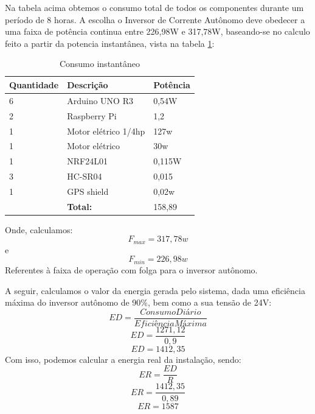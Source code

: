 Na tabela acima obtemos o consumo total de todos os componentes durante um período de 8 horas. A escolha o Inversor de Corrente Autônomo deve obedecer a uma faixa de potência continua entre 226,98W e 317,78W, baseando-se no calculo feito a partir da potencia instantânea, vista na tabela \ref{cap:proposta:tab:instantaneo}: 

\begin{table}[]
\centering
\caption{Consumo instantâneo}
\label{cap:proposta:tab:instantaneo}
\begin{tabular}{l|l|l|}
\hline
\multicolumn{1}{|l|}{\textbf{Quantidade}} & \textbf{Descrição}   & \textbf{Potência} \\ \hline
\multicolumn{1}{|l|}{6}                   & Arduino UNO R3       & 0,54W             \\ \hline
\multicolumn{1}{|l|}{2}                   & Raspberry Pi         & 1,2               \\ \hline
\multicolumn{1}{|l|}{1}                   & Motor elétrico 1/4hp & 127w             \\ \hline
\multicolumn{1}{|l|}{1}                   & Motor elétrico       & 30w               \\ \hline
\multicolumn{1}{|l|}{1}                   & NRF24L01             & 0,115W            \\ \hline
\multicolumn{1}{|l|}{3}                   & HC-SR04              & 0,015             \\ \hline
\multicolumn{1}{|l|}{1}                   & GPS shield           & 0,02w             \\ \hline
                                          & \textbf{Total:}      & 158,89        \\ \cline{2-3} 
\end{tabular}
\end{table}
Onde, calculamos:
\[F_{max}=317,78w\] e \[F_{min}=226,98w\]
Referentes à faixa de operação com folga para o inversor autônomo. 

A seguir, calculamos o valor da energia gerada pelo sistema, dada uma eficiência máxima do inversor autônomo de 90\%, bem como a sua tensão de 24V:
\[ED =\frac{Consumo Diário}{Eficiência Máxima}\]
\[ED = \frac{1271,12}{0,9}\]
\[ED = 1412,35\]
Com isso, podemos calcular a energia real da instalação, sendo:
\[ER=\frac{ED}{R}\]
\[ER=\frac{1412,35}{0,89}\]
\[ER=1587\]

